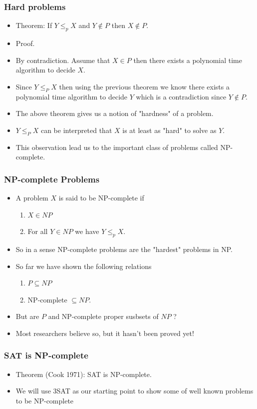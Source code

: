 \documentclass{beamer}
\begin{document}
\begin{frame}
\frametitle{Hard problems}
  \begin{itemize}

  \item Theorem: If $Y\le_p X$ and $Y\notin P$ then $X\notin P$.
\item Proof.
\item By contradiction. Assume that $X\in P$ then there exists a polynomial time algorithm to decide $X$. 
\item Since $Y\le_P X$ then using the previous theorem we know there exists a polynomial time algorithm to decide $Y$ which is a contradiction since $Y\notin P$.
\item The above theorem gives us a notion of "hardness" of a problem.
\item $Y\le_P X$ can be interpreted that $X$ is at least as "hard" to solve as $Y$.
\item This observation lead us to the important class of problems called NP-complete.
  \end{itemize}
\end{frame}
\begin{frame}
  \frametitle{NP-complete Problems}
  \begin{itemize}
  \item A problem $X$ is said to be NP-complete if
    \begin{enumerate}
    \item $X\in NP$
   \item For all $Y\in NP$ we have $Y\le_p X$.
    \end{enumerate}
\item So in a sense NP-complete problems are the "hardest" problems in NP.
\item So far we have shown the following relations
  \begin{enumerate}
  \item $P\subseteq NP$
  \item NP-complete $\subseteq NP$.
  \end{enumerate}
\item But are $P$ and NP-complete proper susbsets of $NP$ ?
\item Most researchers believe so, but it hasn't been proved yet!
  \end{itemize}

\end{frame}


\begin{frame}
  \frametitle{SAT is NP-complete}
  \begin{itemize}
   \item Theorem (Cook 1971): SAT is NP-complete.

   \item We will use 3SAT as our starting point to show some of well known problems to be NP-complete 
  \end{itemize}
\end{frame}
\end{document}
